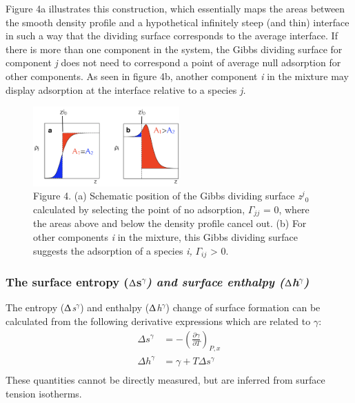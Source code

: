 \documentclass[9pt,bestpractices]{livecoms}
\begin{document}
Figure 4a illustrates this construction, which essentially maps the areas
between the smooth density profile and a hypothetical infinitely steep (and
thin) interface in such a way that the dividing surface corresponds to the
average interface. If there is more than one component in the system, the
Gibbs dividing surface for component \textit{j} does not need to correspond
a point of average null adsorption for other components. As seen in figure 4b,
another component \textit{i} in the mixture may display adsorption at the
interface relative to a species \textit{j.}

\begin{figure}
\includegraphics[width=0.5\textwidth]{gfx/image11.png}
\caption{Figure 4. (a) Schematic position of the Gibbs dividing surface \textit{z}$^{j}$$_{0 }$calculated by selecting the point of no adsorption, ${\Gamma}$$_{jj}$ = 0, where the areas above and below the density profile cancel out. (b) For other components \textit{i}  in the mixture, this Gibbs dividing surface suggests the adsorption of a species \textit{i,} ${\Gamma}$$_{ij}$ {\textgreater} 0.}
\label{fig:3}
\end{figure}

\subsubsection{The surface entropy (${\Updelta}$s$^{{\gamma}}$\textit{) and surface enthalpy (${\Updelta}$h}$^{{\gamma}}$\textit{)}}

The entropy (${\Updelta}$\textit{s}$^{{\gamma}}$) and enthalpy
(${\Updelta}$\textit{h}$^{{\gamma}}$) change of surface formation can be
calculated from the following derivative expressions which are related to
{${\gamma}$}\citep{evans1992}: 
\begin{align}
  \Delta s^{\gamma} &=-\left(\frac{\partial\gamma}{\partial T}\right)_{P,x} \\
  \Delta h^{\gamma} &=\gamma+T\Delta s^{\gamma} \\
\end{align}
These quantities cannot be directly measured, but are inferred from surface tension isotherms.
\end{document}
